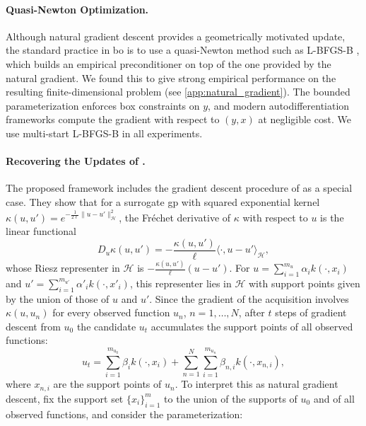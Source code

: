 \documentclass{article}
\newcommand{\Hs}{\mathcal{H}}
\newcommand{\norm}[1]{\lVert #1 \rVert}
\newcommand{\inner}[2]{\langle #1, #2 \rangle}
\newcommand{\kernelH}{k}
\newcommand{\kernelGP}{\kappa}
\newcommand{\vu}{u}
\begin{document}
\paragraph{Quasi-Newton Optimization.}
Although natural gradient descent provides a geometrically motivated update, the standard practice in \gls{bo} is to use a quasi-Newton method such as L-BFGS-B \citep{byrd1995lbfgsb}, which builds an empirical preconditioner on top of the one provided by the natural gradient. We found this to give strong empirical performance on the resulting finite-dimensional problem (see \cref{app:natural_gradient}). The bounded parameterization enforces box constraints on $y$, and modern autodifferentiation frameworks compute the gradient with respect to $(y, x)$ at negligible cost. We use multi-start L-BFGS-B in all experiments.

\paragraph{Recovering the Updates of \cite{vien2018bayesian}.}
The proposed framework includes the gradient descent procedure of \cite{vien2018bayesian} as a special case. They show that for a surrogate \gls{gp} with squared exponential kernel $\kernelGP(\vu, \vu') = e^{-\frac{1}{2\ell}\norm{\vu-\vu'}_\Hs^2}$, the Fr\'echet derivative of $\kernelGP$ with respect to $\vu$ is the linear functional
\begin{equation}
    D_\vu \kernelGP(\vu, \vu') = -\frac{\kernelGP(\vu, \vu')}{\ell}\inner{\cdot}{\vu - \vu'}_\Hs,
\end{equation}
whose Riesz representer in $\Hs$ is $-\frac{\kernelGP(\vu, \vu')}{\ell}(\vu - \vu')$. For $\vu = \sum_{i=1}^{m_\vu} \alpha_i \kernelH(\cdot, x_i)$ and $\vu' = \sum_{i=1}^{m_{\vu'}} \alpha'_i \kernelH(\cdot, x'_i)$, this representer lies in $\Hs$ with support points given by the union of those of $\vu$ and $\vu'$. Since the gradient of the acquisition involves $\kernelGP(\vu, \vu_n)$ for every observed function $\vu_n$, $n=1,\ldots,N$, after $t$ steps of gradient descent from $\vu_0$ the candidate $\vu_t$ accumulates the support points of all observed functions:
\begin{equation}
    \vu_t = \sum_{i=1}^{m_{\vu_0}} \beta_i \kernelH(\cdot, x_i) + \sum_{n=1}^{N}\sum_{i=1}^{m_{\vu_n}} \beta_{n,i} \kernelH(\cdot, x_{n,i}),
    \label{eq:vien_support}
\end{equation}
where $x_{n,i}$ are the support points of $\vu_n$.
To interpret this as natural gradient descent, fix the support set $\{x_i\}_{i=1}^m$ to the union of the supports of $\vu_0$ and of all observed functions, and consider the parameterization:
\end{document}
